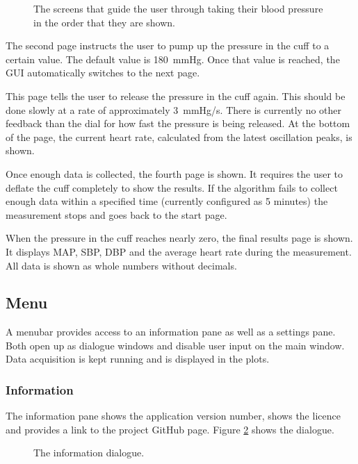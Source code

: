 \begin{figure}[ht]
\centering
\caption{The screens that guide the user through taking their blood pressure in the order that they are shown.}
\label{fig:UIguide}
\end{figure}

The second page instructs the user to pump up the pressure in the cuff to a certain value. The default value is \SI{180}{\mmHg}. Once that value is reached, the GUI automatically switches to the next page.

This page tells the user to release the pressure in the cuff again. This should be done slowly at a rate of approximately \SI{3}{\mmHg/\second}. There is currently no other feedback than the dial for how fast the pressure is being released. At the bottom of the page, the current heart rate, calculated from the latest oscillation peaks, is shown.

Once enough data is collected, the fourth page is shown. It requires the user to deflate the cuff completely to show the results. If the algorithm fails to collect enough data within a specified time (currently configured as 5 minutes) the measurement stops and goes back to the start page.

When the pressure in the cuff reaches nearly zero, the final results page is shown. It displays MAP, SBP, DBP and the average heart rate during the measurement. All data is shown as whole numbers without decimals. 

\subsection{Menu}
A menubar provides access to an information pane as well as a settings pane. Both open up as dialogue windows and disable user input on the main window. Data acquisition is kept running and is displayed in the plots.

\subsubsection{Information}
The information pane shows the application version number, shows the licence and provides a link to the project GitHub page. Figure \ref{fig:UIinfo} shows the dialogue.

\begin{figure}[ht]
\centering
\caption{The information dialogue.}
\label{fig:UIinfo}
\end{figure}


